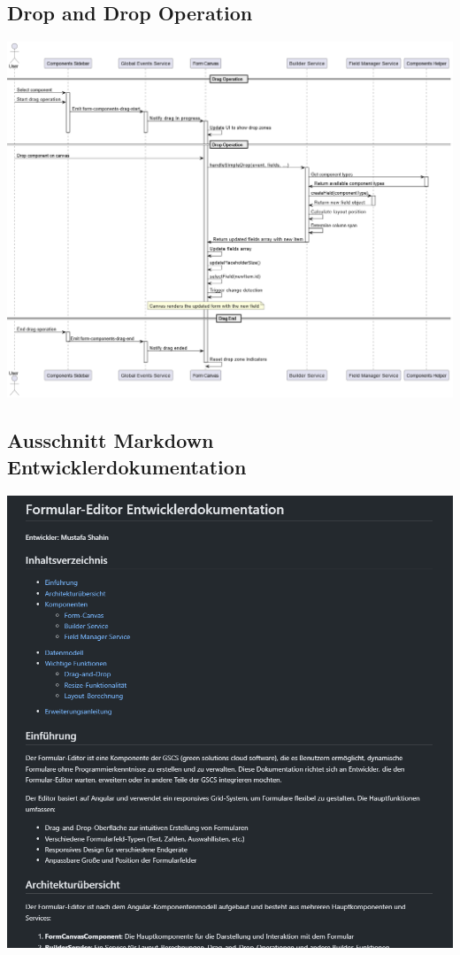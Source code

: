 \documentclass[a4paper,11pt]{article}
\begin{document}
\subsection{ Drop and Drop Operation}
\includegraphics[width=1.1\textwidth]{DragAndDrop.drawio}
\newpage

\newpage
\subsection{Ausschnitt Markdown Entwicklerdokumentation}
\includegraphics[width=1.1\textwidth]{dev-doc}
\end{document}
